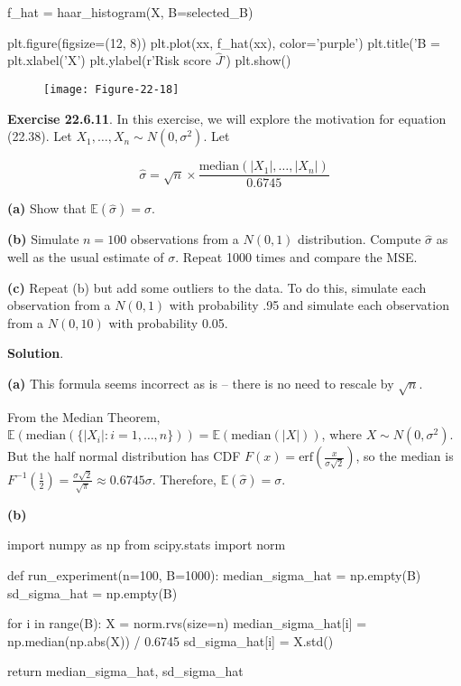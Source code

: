 \begin{python}
f_hat = haar_histogram(X, B=selected_B)

plt.figure(figsize=(12, 8))
plt.plot(xx, f_hat(xx), color='purple')
plt.title('B = %
plt.xlabel('X')
plt.ylabel(r'Risk score $\hat{J}$')
plt.show()
\end{python}

\begin{figure}[H]
\centering
\texttt{[image: Figure-22-18]}
\end{figure}

\textbf{Exercise 22.6.11}. In this exercise, we will explore the
motivation for equation (22.38). Let
\(X_{1}, \dots, X_{n} \sim N(0, \sigma^{2})\). Let

\[ \hat{\sigma} = \sqrt{n} \times \frac{\text{median} (| X_{1}|, \dots, |X_{n}|)}{0.6745} \]

\textbf{(a)} Show that \(\mathbb{E}(\hat{\sigma}) = \sigma\).

\textbf{(b)} Simulate \(n = 100\) observations from a \(N(0, 1)\)
distribution. Compute \(\hat{\sigma}\) as well as the usual estimate of
\(\sigma\). Repeat 1000 times and compare the MSE.

\textbf{(c)} Repeat (b) but add some outliers to the data. To do this,
simulate each observation from a \(N(0, 1)\) with probability .95 and
simulate each observation from a \(N(0, 10)\) with probability 0.05.

\textbf{Solution}.

\textbf{(a)} This formula seems incorrect as is -- there is no need to
rescale by \(\sqrt{n}\).

From the Median Theorem,
\(\mathbb{E}(\text{median}( \{ |X_{i}| : i = 1, \dots, n \} )) = \mathbb{E}(\text{median}(|X|))\),
where \(X \sim N(0, \sigma^{2})\). But the half normal distribution has
CDF \(F(x) = \text{erf}\left(\frac{x}{\sigma \sqrt{2}}\right)\), so the
median is
\(F^{-1}\left(\frac{1}{2}\right) = \frac{\sigma \sqrt{2}}{\sqrt{\pi}} \approx 0.6745 \sigma\).
Therefore, \(\mathbb{E}(\hat{\sigma}) = \sigma\).

\textbf{(b)}

\begin{python}
import numpy as np
from scipy.stats import norm

def run_experiment(n=100, B=1000):
    median_sigma_hat = np.empty(B)
    sd_sigma_hat = np.empty(B)
    
    for i in range(B):
        X = norm.rvs(size=n)
        median_sigma_hat[i] = np.median(np.abs(X)) / 0.6745
        sd_sigma_hat[i] = X.std()
    
    return median_sigma_hat, sd_sigma_hat
\end{python}

